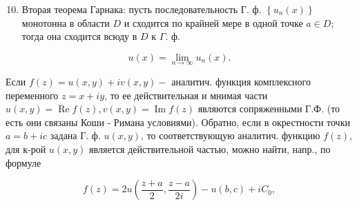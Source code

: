 \documentclass[10pt]{article}
\begin{document}
\begin{enumerate}

  \setcounter{enumi}{9}

  \item Вторая теорема Гарнака: пусть последовательность Г. ф. $\left\{u_{n}(x)\right\}$ монотонна в области $D$ и сходится по крайней мере в одной точке $a \in D$; тогда она сходится всюду в $D$ к $\Gamma$. ф.

\end{enumerate}



\[

u(x)=\lim _{n \rightarrow \infty} u_{n}(x) .

\]



Если $f(z)=u(x, y)+i v(x, y)-$ аналитич. функция комплексного переменного $z=x+i y$, то ее действительная и мнимая части $u(x, y)=\operatorname{Re} f(z), v(x, y)=\operatorname{Im} f(z)$ являются сопряженными Г.Ф. (то есть они связаны Коши - Римана условиями). Обратно, если в окрестности точки $a=b+i c$ задана Г. ф. $u(x, y)$, то соответствующую аналитич. функцию $f(z)$, для к-рой $u(x, y)$ является действительной частью, можно найти, напр., по формуле



\[

f(z)=2 u\left(\frac{z+a}{2}, \frac{z-a}{2 i}\right)-u(b, c)+i C_{0},

\]
\end{document}
